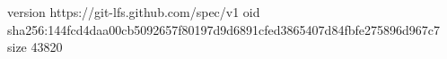 version https://git-lfs.github.com/spec/v1
oid sha256:144fcd4daa00cb5092657f80197d9d6891cfed3865407d84fbfe275896d967c7
size 43820
